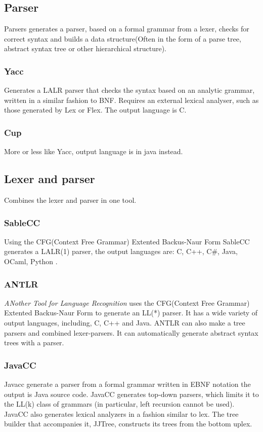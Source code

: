 \subsection{Parser}
Parsers generates a parser, based on a formal grammar from a lexer, checks for correct syntax and builds a data structure(Often in the form of a parse tree, abstract syntax tree or other hierarchical structure). 

\subsubsection{Yacc}
Generates a LALR parser that checks the syntax based on an analytic grammar, written in a similar fashion to BNF. Requires an external lexical analyser, such as those generated by Lex or Flex. The output language is C. \citep{Yacc}

\subsubsection{Cup}
More or less like Yacc, output language is in java instead. \citep{CUP}

\subsection{Lexer and parser}
Combines the lexer and parser in one tool.

\subsubsection{SableCC}
Using the CFG(Context Free Grammar) Extented Backus-Naur Form SableCC generates a LALR(1) parser, the output languages are: C, C++, C\#, Java, OCaml, Python \citep{SableCC}.

\subsubsection{ANTLR}
\textit{ANother Tool for Language Recognition} uses the CFG(Context Free Grammar) Extented Backus-Naur Form to generate an LL(*) parser. It has a wide variety of output languages, including, C, C++ and Java.
ANTLR can also make a tree parsers and combined lexer-parsers. It can automatically generate abstract syntax trees with a parser. \citep{ANTLR} %


\subsubsection{JavaCC}
Javacc generate a parser from a formal grammar written in EBNF notation the output is Java source code. JavaCC generates top-down parsers, which limits it to the LL(k) class of grammars (in particular, left recursion cannot be used). JavaCC also generates lexical analyzers in a fashion similar to lex\citep{Javacc}. The tree builder that accompanies it, JJTree, constructs its trees from the bottom uplex\citep{JJTree}.


